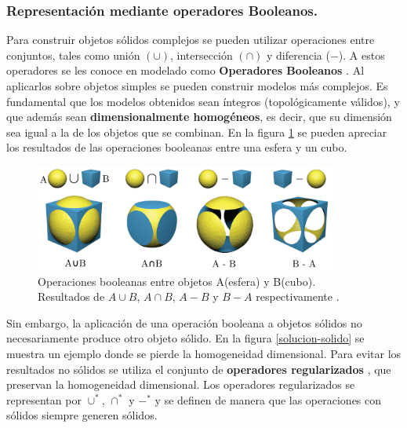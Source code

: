 \subsubsection{Representación mediante operadores Booleanos. }

Para construir objetos sólidos complejos se pueden utilizar operaciones entre conjuntos, tales como unión $(\cup)$, intersección $(\cap)$ y diferencia ($-$). A estos operadores se les conoce en modelado como \textbf{Operadores Booleanos} \citep{Ramos2011}. Al aplicarlos sobre objetos simples se pueden construir modelos más complejos. Es fundamental que los modelos obtenidos sean íntegros (topológicamente válidos), y que además sean \textbf{dimensionalmente homogéneos}, es decir, que su dimensión sea igual a la de los objetos que se combinan. En la figura \ref{fig:booleano1} se pueden apreciar los resultados de las operaciones booleanas entre una esfera y un cubo.

\begin{figure}[ht]
\includegraphics[width=10cm]{Img/GEO/boolean55.png}
\centering
\caption{\footnotesize{Operaciones booleanas entre objetos A(esfera) y B(cubo). Resultados de $A \cup B$,  $A \cap B$, $A - B$  y  $B - A$ } respectivamente \citep{Zhou2018}.}
\label{fig:booleano1}
\end{figure}

\vspace{5mm}

Sin embargo, la aplicación de una operación booleana a objetos sólidos no necesariamente produce otro objeto sólido. En la figura \ref{solucion-solido} se muestra un ejemplo donde se pierde la homogeneidad dimensional. Para evitar los resultados no sólidos se utiliza el conjunto de \textbf{operadores regularizados} \citep{Ramos2011}, que preservan la homogeneidad dimensional. Los operadores regularizados se representan por $\cup^*$, $\cap^*$ y $-^*$ y se definen de manera que las operaciones con sólidos siempre generen sólidos. 

